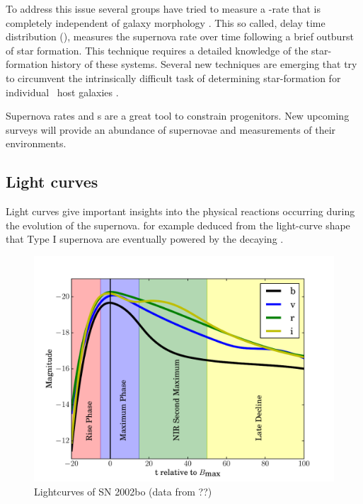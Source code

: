 To address this issue several groups have tried to measure a \sneia-rate that is completely independent of galaxy morphology \citep[e.g.][]{2006MNRAS.370..773M, 2010ApJ...722.1879M}. This so called, delay time distribution (\dtd), measures the supernova rate over time following a brief outburst of star formation.
This technique requires a detailed knowledge of the star-formation history of these systems. Several new techniques are emerging that try to circumvent the intrinsically difficult task of determining star-formation for individual \sneia\ host galaxies \citep{2010MNRAS.407.1314M, 2010arXiv1010.5786B, 2008PASJ...60.1327T, 2010ApJ...722.1879M}.

Supernova rates and \dtd s are a great tool to constrain progenitors. New upcoming surveys will provide an abundance of supernovae and measurements of their environments.

\subsection{Light curves} 
Light curves give important insights into the physical reactions occurring during the evolution of the supernova. \cite{1982ApJ...253..785A} for example deduced from the light-curve shape that Type I supernova are eventually powered by the decaying \Co. 


\begin{figure}[htb] %
   \centering
   \includegraphics[width=\textwidth]{chapter_intro/plots/lightcurve_2002bo.pdf} 
   \caption{Lightcurves of SN 2002bo (data from ??)}
   \label{fig:lightcurve_2002bo}
\end{figure}

